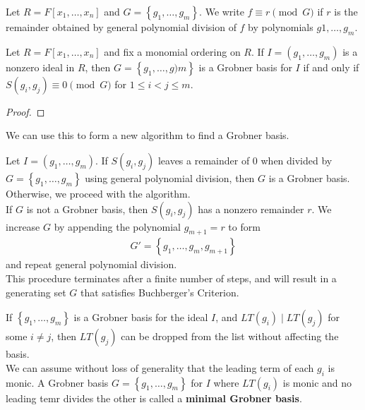 \documentclass{memoir}
\begin{document}
\begin{rmrk}
	Let \(R = F[x_1,\ldots,x_n]\) and \(G = \left\{ g_1,\ldots,g_m \right\} \). We write \(f \equiv r \pmod{G}\) if \(r\) is the remainder obtained by general polynomial division of \(f\) by polynomials \(g1,\ldots,g_m\).
\end{rmrk}

\begin{prop}
	Let \(R = F[x_1,\ldots,x_n]\) and fix a monomial ordering on \(R\). If \(I = (g_1,\ldots,g_m)\) is a nonzero ideal in \(R\), then \(G = \left\{ g_1,\ldots,g)m \right\} \) is a Grobner basis for \(I\) if and only if \(S(g_i,g_j) \equiv 0 \pmod{G}\) for \(1\leq i<j\leq m\).
\end{prop}
\begin{proof}
	
\end{proof}

We can use this to form a new algorithm to find a Grobner basis.

\begin{general}
	Let \(I = (g_1,\ldots,g_m)\). If \(S(g_i,g_j)\) leaves a remainder of \(0\) when divided by  \(G = \left\{ g_1,\ldots,g_m \right\} \) using general polynomial division, then \(G\) is a Grobner basis. Otherwise, we proceed with the algorithm.\\

	If \(G\) is not a Grobner basis, then \(S(g_i,g_j)\) has a nonzero remainder \(r\). We increase \(G\) by appending the polynomial \(g_{m+1} =r\) to form
	 \begin{align*}
		G' = \left\{g_1,\ldots,g_m,g_{m+1}  \right\} 
	\end{align*}
	and repeat general polynomial division.\\

	This procedure terminates after a finite number of steps, and will result in a generating set \(G\) that satisfies Buchberger's Criterion.\\
\end{general}
If \(\left\{ g_1,\ldots,g_m \right\} \) is a Grobner basis for the ideal \(I\), and \(LT(g_i)\mid LT(g_j)\) for some \(i\neq j\), then \(LT(g_j)\) can be dropped from the list without affecting the basis.\\

We can assume without loss of generality that the leading term of each \(g_i\) is monic. A Grobner basis \(G = \left\{g_1,\ldots,g_m \right\} \) for \(I\) where \(LT(g_i)\) is monic and no leading temr divides the other is called a \textbf{minimal Grobner basis}.\\
\end{document}
